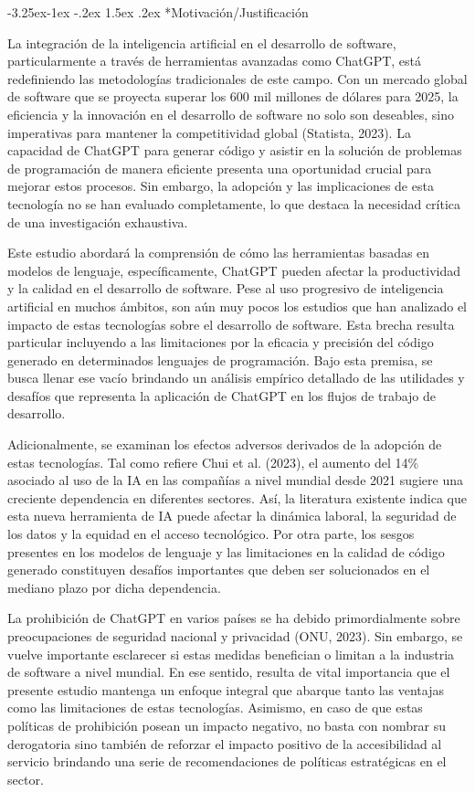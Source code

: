 \documentclass[12pt,a4paper]{article}
\makeatletter
\renewcommand\subsection{\@startsection{subsection}{2}{\z@}%
  {-3.25ex\@plus -1ex \@minus -.2ex}%
  {1.5ex \@plus .2ex}%
  {\normalfont\normalsize}}
\makeatother
\begin{document}
\subsection*{Motivación/Justificación}

La integración de la inteligencia artificial en el desarrollo de software, particularmente a través de herramientas avanzadas como ChatGPT, está redefiniendo las metodologías tradicionales de este campo. Con un mercado global de software que se proyecta superar los 600 mil millones de dólares para 2025, la eficiencia y la innovación en el desarrollo de software no solo son deseables, sino imperativas para mantener la competitividad global (Statista, 2023). La capacidad de ChatGPT para generar código y asistir en la solución de problemas de programación de manera eficiente presenta una oportunidad crucial para mejorar estos procesos. Sin embargo, la adopción y las implicaciones de esta tecnología no se han evaluado completamente, lo que destaca la necesidad crítica de una investigación exhaustiva.

Este estudio abordará la comprensión de cómo las herramientas basadas en modelos de lenguaje, específicamente, ChatGPT pueden afectar la productividad y la calidad en el desarrollo de software. Pese al uso progresivo de inteligencia artificial en muchos ámbitos, son aún muy pocos los estudios que han analizado el impacto de estas tecnologías sobre el desarrollo de software. Esta brecha resulta particular incluyendo a las limitaciones por la eficacia y precisión del código generado en determinados lenguajes de programación. Bajo esta premisa, se busca llenar ese vacío brindando un análisis empírico detallado de las utilidades y desafíos que representa la aplicación de ChatGPT en los flujos de trabajo de desarrollo.

Adicionalmente, se examinan los efectos adversos derivados de la adopción de estas tecnologías. Tal como refiere Chui et al. (2023), el aumento del 14\% asociado al uso de la IA en las compañías a nivel mundial desde 2021 sugiere una creciente dependencia en diferentes sectores. Así, la literatura existente indica que esta nueva herramienta de IA puede afectar la dinámica laboral, la seguridad de los datos y la equidad en el acceso tecnológico. Por otra parte, los sesgos presentes en los modelos de lenguaje y las limitaciones en la calidad de código generado constituyen desafíos importantes que deben ser solucionados en el mediano plazo por dicha dependencia.

La prohibición de ChatGPT en varios países se ha debido primordialmente sobre preocupaciones de seguridad nacional y privacidad (ONU, 2023). Sin embargo, se vuelve importante esclarecer si estas medidas benefician o limitan a la industria de software a nivel mundial. En ese sentido, resulta de vital importancia que el presente estudio mantenga un enfoque integral que abarque tanto las ventajas como las limitaciones de estas tecnologías. Asimismo, en caso de que estas políticas de prohibición posean un impacto negativo, no basta con nombrar su derogatoria sino también de reforzar el impacto positivo de la accesibilidad al servicio brindando una serie de recomendaciones de políticas estratégicas en el sector.
\end{document}
